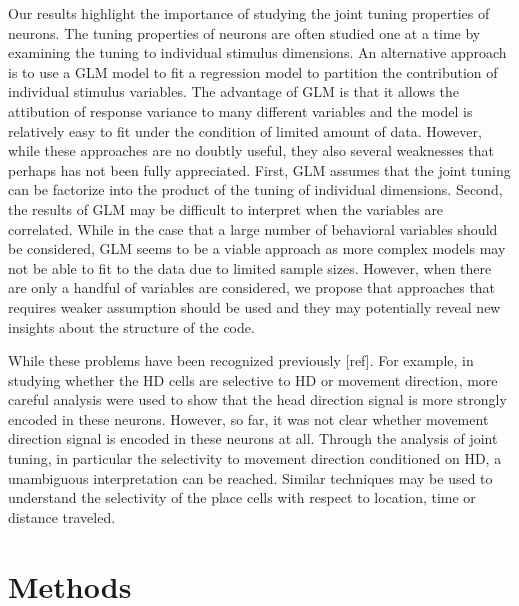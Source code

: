 \documentclass[11pt]{article}
\begin{document}
Our results highlight the importance of studying the joint tuning properties of neurons. The tuning properties of neurons are often studied one at a time by examining the tuning to individual stimulus dimensions. An alternative approach is to use a GLM model to fit a regression model to partition the contribution of individual stimulus variables. The advantage of GLM is that it allows the attibution of response variance to many different variables and the model is relatively easy to fit under the condition of limited amount of data. However, while these approaches are no doubtly useful, they also several weaknesses that perhaps has not been fully appreciated. First, GLM assumes that the joint tuning can be factorize into the product of the tuning of individual dimensions. Second, the results of GLM may be difficult to interpret when the variables are correlated. While in the case that a large number of behavioral variables should be considered, GLM seems to be a viable approach as more complex models may not be able to fit to the data due to limited sample sizes. However, when there are only a handful of variables are considered, we propose that approaches that requires weaker assumption should be used and they may potentially reveal new insights about the structure of the code. 


While these problems have been recognized previously [ref]. For example, in studying whether the HD cells are selective to HD or movement direction, more careful analysis were used to show that the head direction signal is more strongly encoded in these neurons. However, so far, it was not clear whether movement direction signal is encoded in these neurons at all. Through the analysis of joint tuning, in particular the selectivity to movement direction conditioned on HD, a unambiguous interpretation can be reached. Similar techniques may be used to understand the selectivity of the place cells with respect to location, time or distance traveled. 







\newpage

\section{Methods} 
\end{document}
